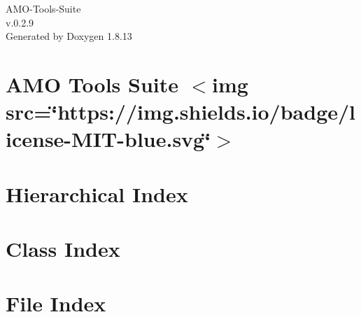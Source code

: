 \documentclass[twoside]{book}
\newcommand{\+}{\discretionary{\mbox{\scriptsize$\hookleftarrow$}}{}{}}
\newcommand{\clearemptydoublepage}{%
  \newpage{\pagestyle{empty}\cleardoublepage}%
}
\begin{document}
\hypersetup{pageanchor=false,
             bookmarksnumbered=true,
             pdfencoding=unicode
            }
\begin{titlepage}
\vspace*{7cm}
\begin{center}%
{\Large A\+M\+O-\/\+Tools-\/\+Suite \\[1ex]\large v.\+0.\+2.\+9 }\\
\vspace*{1cm}
{\large Generated by Doxygen 1.8.13}\\
\end{center}
\end{titlepage}
\clearemptydoublepage
{}
\tableofcontents
\clearemptydoublepage
{}
\hypersetup{pageanchor=true}

\chapter{A\+MO Tools Suite $<$img src=\char`\"{}https\+://img.\+shields.\+io/badge/license-\/\+M\+I\+T-\/blue.\+svg\char`\"{}$>$}
\label{index}\hypertarget{index}{}
\chapter{Hierarchical Index}

\chapter{Class Index}

\chapter{File Index}

\end{document}
